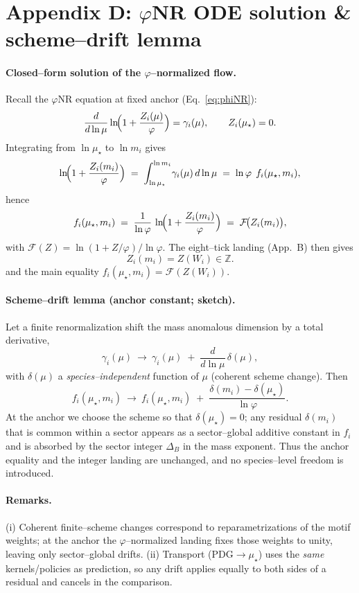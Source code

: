 \documentclass[epjc3]{svjour3}
\begin{document}
\bigskip

\section*{Appendix D: $\varphi$NR ODE solution \& scheme–drift lemma}

\paragraph{Closed–form solution of the $\varphi$–normalized flow.}
Recall the $\varphi$NR equation at fixed anchor (Eq.~\eqref{eq:phiNR}):
\[
  \frac{d}{d\ln\mu}\ln\!\Bigl(1+\frac{Z_i(\mu)}{\varphi}\Bigr)=\gamma_i(\mu),\qquad Z_i(\mu_\star)=0.
\]
Integrating from $\ln\mu_\star$ to $\ln m_i$ gives
\[
  \ln\!\Bigl(1+\frac{Z_i(m_i)}{\varphi}\Bigr)
  \;=\;\int_{\ln\mu_\star}^{\ln m_i}\!\gamma_i(\mu)\,d\ln\mu
  \;=\;\ln\varphi\;\, f_i(\mu_\star,m_i),
\]
hence
\[
  f_i(\mu_\star,m_i) \;=\; \frac{1}{\ln\varphi}\,\ln\!\Bigl(1+\frac{Z_i(m_i)}{\varphi}\Bigr) \;=\; \mathcal F\!\bigl(Z_i(m_i)\bigr),
\]
with $\mathcal F(Z)=\ln(1+Z/\varphi)/\ln\varphi$.  The eight–tick landing (App.~B) then gives
\begin{equation}
  Z_i(m_i)=Z(W_i)\in\mathbb{Z}.
  \label{eq:Z-landing}
\end{equation}
and the main equality $f_i(\mu_\star,m_i)=\mathcal F(Z(W_i))$.

\paragraph{Scheme–drift lemma (anchor constant; sketch).}
Let a finite renormalization shift the mass anomalous dimension by a total derivative,
\[
  \gamma_i(\mu)\ \longrightarrow\ \gamma_i(\mu)\;+\;\frac{d}{d\ln\mu}\,\delta(\mu),
\]
with $\delta(\mu)$ a \emph{species–independent} function of $\mu$ (coherent scheme change).  Then
\[
  f_i(\mu_\star,m_i)\ \longrightarrow\ f_i(\mu_\star,m_i)\;+\;\frac{\delta(m_i)-\delta(\mu_\star)}{\ln\varphi}.
\]
At the anchor we choose the scheme so that $\delta(\mu_\star)=0$; any residual $\delta(m_i)$ that is common within a sector appears as a sector–global additive constant in $f_i$ and is absorbed by the sector integer $\Delta_B$ in the mass exponent.  Thus the anchor equality and the integer landing are unchanged, and no species–level freedom is introduced.

\paragraph{Remarks.}
(i) Coherent finite–scheme changes correspond to reparametrizations of the motif weights; at the anchor the $\varphi$–normalized landing fixes those weights to unity, leaving only sector–global drifts. (ii) Transport (PDG$\to\mu_\star$) uses the \emph{same} kernels/policies as prediction, so any drift applies equally to both sides of a residual and cancels in the comparison.
\end{document}
